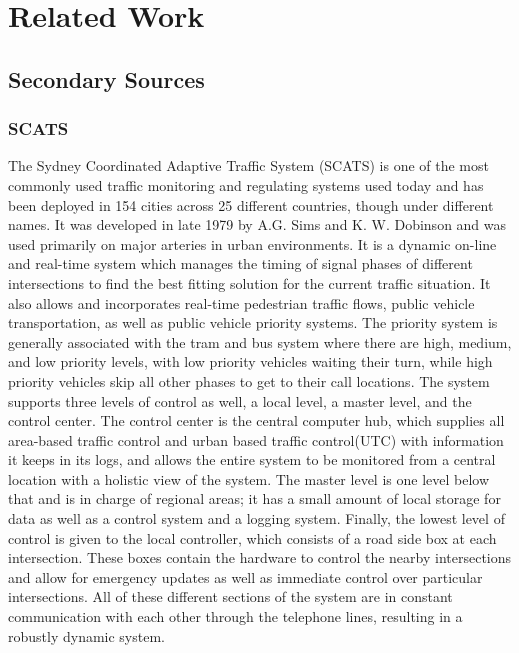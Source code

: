 %
%
\chapter{Related Work}\label{ch:relatedwork}

\section{Secondary Sources}

\subsection{SCATS}
The Sydney Coordinated Adaptive Traffic System (SCATS) is one of the most commonly used traffic monitoring and regulating systems used today and has been deployed in 154 cities across 25 different countries, though under different names.  It was developed in late 1979 by A.G. Sims and K. W. Dobinson and was used primarily on major arteries in urban environments.  It is a dynamic on-line and real-time system which manages the timing of signal phases of different intersections to find the best fitting solution for the current traffic situation.  It also allows and incorporates real-time pedestrian traffic flows, public vehicle transportation, as well as public vehicle priority systems.  The priority system is generally associated with the tram and bus system where there are  high, medium, and low priority levels, with  low priority vehicles waiting their turn, while high priority vehicles skip all other phases to get to their call locations.  The system supports three levels of control as well, a local level, a master level, and the control center.  The control center is the central computer hub, which supplies all area-based traffic control and urban based traffic control(UTC) with information it keeps in its logs, and allows the entire system to be monitored from a central location with a holistic view of the system.  The master level is one level below that and is in charge of regional areas; it has a small amount of local storage for data as well as a control system and a logging system.  Finally, the lowest level of control is given to the local controller, which consists of a road side box at each intersection. These boxes contain the hardware to control the nearby intersections and allow for emergency updates as well as immediate control over particular intersections.  All of these different sections of the system are in constant communication with each other through the telephone lines, resulting in a robustly dynamic system\cite{SCATS}.

